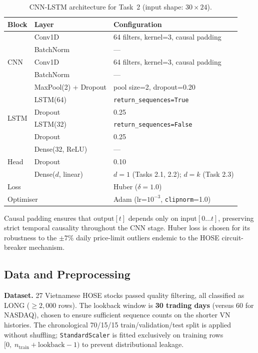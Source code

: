 \documentclass[12pt, a4paper]{article}
\begin{document}
\begin{table}[h]
\centering
\caption{CNN-LSTM architecture for Task~2
         (input shape: $30 \times 24$).}
\label{tab:cnn_lstm_arch}
\renewcommand{\arraystretch}{1.3}
\begin{tabular}{lll}
\hline
\textbf{Block} & \textbf{Layer} & \textbf{Configuration} \\
\hline
\multirow{5}{*}{CNN}
  & Conv1D  & 64 filters, kernel=3, causal padding \\
  & BatchNorm & --- \\
  & Conv1D  & 64 filters, kernel=3, causal padding \\
  & BatchNorm & --- \\
  & MaxPool(2) + Dropout & pool size=2, dropout=0.20 \\
\hline
\multirow{4}{*}{LSTM}
  & LSTM(64) & \texttt{return\_sequences=True} \\
  & Dropout  & 0.25 \\
  & LSTM(32) & \texttt{return\_sequences=False} \\
  & Dropout  & 0.25 \\
\hline
\multirow{3}{*}{Head}
  & Dense(32, ReLU) & --- \\
  & Dropout         & 0.10 \\
  & Dense($d$, linear) & $d=1$ (Tasks 2.1, 2.2); $d=k$ (Task 2.3) \\
\hline
\multicolumn{2}{l}{Loss}      & Huber ($\delta=1.0$) \\
\multicolumn{2}{l}{Optimiser} & Adam (lr=$10^{-3}$, \texttt{clipnorm}=1.0) \\
\hline
\end{tabular}
\end{table}

Causal padding ensures that $\text{output}[t]$ depends only on
$\text{input}[0 \ldots t]$, preserving strict temporal causality throughout
the CNN stage. Huber loss is chosen for its robustness to the $\pm7\%$
daily price-limit outliers endemic to the HOSE circuit-breaker mechanism.

\subsection{Data and Preprocessing}

\textbf{Dataset.} 27 Vietnamese HOSE stocks passed quality filtering,
all classified as LONG ($\geq 2{,}000$ rows). The lookback window is
\textbf{30 trading days} (versus 60 for NASDAQ), chosen to ensure
sufficient sequence counts on the shorter VN histories.
The chronological 70/15/15 train/validation/test split is applied
without shuffling; \texttt{StandardScaler} is fitted exclusively on
training rows $[0,\; n_{\text{train}} + \text{lookback} - 1)$ to
prevent distributional leakage.
\end{document}
